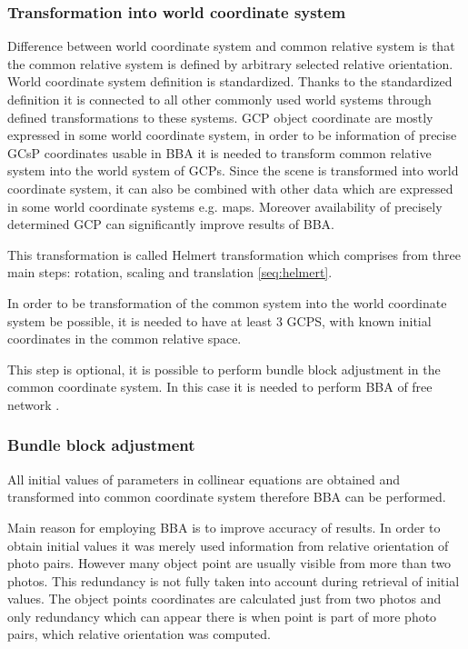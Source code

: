 \documentclass[a4paper,12pt]{article}
\begin{document}
\subsubsection{Transformation into world coordinate system}

Difference between world coordinate system and common relative system is that the common relative system 
is defined by arbitrary selected relative orientation. World coordinate system definition is standardized.
Thanks to the standardized definition it is connected to all other commonly used  world systems through 
defined transformations to these systems.
GCP object coordinate are mostly expressed in some world coordinate system, in order to be 
information of precise GCsP coordinates usable in BBA it is needed to transform common relative 
system into the world system of GCPs. Since the scene is transformed into world coordinate system,
it can also be combined with other data which are expressed in some world coordinate systems e.g.
maps. Moreover availability of precisely determined GCP can significantly improve results of BBA.  


This transformation is called Helmert  transformation which comprises from 
three main steps: rotation, scaling and translation \ref{seq:helmert}.

In order to be transformation of the common system into the world coordinate system be possible, it is needed 
to have at least 3 GCPS, with known initial coordinates in the common relative space. 
 
This step is optional, it is possible to perform bundle block adjustment in the common coordinate system. In this 
case it is needed to perform BBA of free network \label{sec:free_net_least}. 

\subsubsection{Bundle block adjustment}

All initial values of parameters in collinear equations are obtained and transformed into common coordinate system therefore 
BBA can be performed.

Main reason for employing BBA is to improve accuracy of results.
In order to obtain initial values it was merely used information from relative orientation of photo pairs.
However many object point are usually visible from more than two photos. This redundancy is not fully taken 
into account during retrieval of initial values. The object points coordinates are calculated 
just from two photos and only redundancy which can appear there is when point is part of more 
photo pairs, which relative orientation was computed. 
\end{document}
